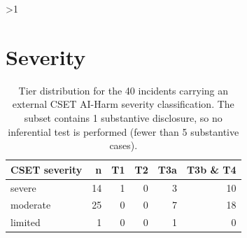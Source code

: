 \documentclass[11pt]{article}
\let\oldsection\section
\newcounter{supsec}
\renewcommand{\section}[1]{\stepcounter{supsec}\ifnum\value{supsec}>1\clearpage\fi\oldsection*{#1}}
\begin{document}
\section{Severity}
\begin{table}[H]
\caption{Tier distribution for the 40 incidents carrying an external CSET AI-Harm severity classification. The subset contains 1 substantive disclosure, so no inferential test is performed (fewer than 5 substantive cases).}
\centering\small
\begin{tabular}{@{}lrrrrr@{}}
\toprule
CSET severity & n & T1 & T2 & T3a & T3b \& T4 \\ \midrule
severe & 14 & 1 & 0 & 3 & 10 \\
moderate & 25 & 0 & 0 & 7 & 18 \\
limited & 1 & 0 & 0 & 1 & 0 \\
\bottomrule
\end{tabular}
\end{table}
\end{document}
